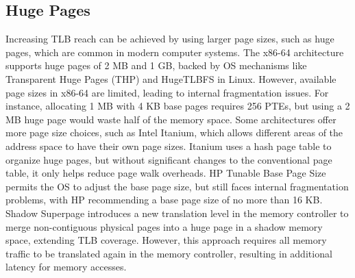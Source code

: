 \subsection{Huge Pages}
Increasing TLB reach can be achieved by using larger page sizes, such as huge pages\cite{panwar_hawkeye_2019}, which are common in modern computer systems. 
The x86-64 architecture supports huge pages of 2 MB and 1 GB, backed by OS mechanisms like Transparent Huge Pages (THP) 
and HugeTLBFS\cite{noauthor_hugetlbfs_nodate} in Linux. However, available page sizes in x86-64 are limited, leading to internal fragmentation issues. 
For instance, allocating 1 MB with 4 KB base pages requires 256 PTEs, but using a 2 MB huge page would waste 
half of the memory space. Some architectures offer more page size choices, such as Intel Itanium, which 
allows different areas of the address space to have their own page sizes. Itanium uses a hash page table to organize huge 
pages, but without significant changes to the conventional page table, it only helps reduce page walk overheads. 
HP Tunable Base Page Size permits the OS to adjust the base page size, but still faces internal fragmentation problems, 
with HP recommending a base page size of no more than 16 KB. Shadow Superpage introduces a new translation level 
in the memory controller to merge non-contiguous physical pages into a huge page in a shadow memory space, extending 
TLB coverage. However, this approach requires all memory traffic to be translated again in the memory controller, 
resulting in additional latency for memory accesses.


